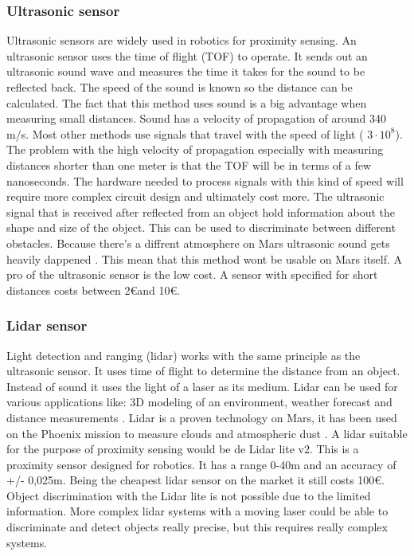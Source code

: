 \documentclass[10pt,a4paper]{article}
\begin{document}
\subsubsection{Ultrasonic sensor}
Ultrasonic sensors are widely used in robotics for proximity sensing. An ultrasonic sensor uses the time of flight (TOF) to operate. It sends out an ultrasonic sound wave and measures the time it takes for the sound to be reflected back. The speed of the sound is known so the distance can be calculated. The fact that this method uses sound is a big advantage when measuring small distances. Sound has a velocity of propagation of around 340 m/s. Most other methods use signals that travel with the speed of light ( $3\cdot10^{8}$). The problem with the high velocity of  propagation especially with measuring distances shorter than one meter is that the TOF will be in terms of a few nanoseconds.  The hardware needed to process signals with this kind of speed will require more complex circuit design and ultimately cost more. The ultrasonic signal that is received after reflected from an object hold information about the shape and size of the object. This can be used to discriminate between different obstacles\cite{ultraobject}. Because there's a diffrent atmosphere on Mars ultrasonic sound gets heavily dappened \cite{soundonmars}. This mean that this method wont be usable on Mars itself. A pro of the ultrasonic sensor is the low cost. A sensor with specified for short distances costs between 2\euro and 10\euro.


\subsubsection{Lidar sensor}
Light detection and ranging (lidar) works with the same principle as the ultrasonic sensor. It uses time of flight to determine the distance from an object. Instead of sound it uses the light of a laser as its medium. Lidar can be used for various applications like: 3D modeling of an environment, weather forecast and distance measurements \cite{whatlidar}. Lidar is a proven technology on Mars, it has been used on the Phoenix mission to measure clouds and atmospheric dust \cite{lidarmars}. A lidar suitable for the purpose of proximity sensing would be de Lidar lite v2. This is a proximity sensor designed for robotics. It has a range 0-40m and an accuracy of +/- 0,025m. Being the cheapest lidar sensor on the market it still costs 100\euro. Object discrimination with the Lidar lite is not possible due to the limited information. More complex lidar systems with a moving laser could be able to discriminate and detect objects really precise, but this requires really complex systems.
\end{document}
